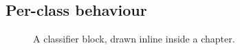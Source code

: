 \subsection{Per-class behaviour}

\begin{figure}[h]
  \centering
  \caption{A classifier block, drawn inline inside a chapter.}
  \label{fig:chapter-tikz}
\end{figure}
